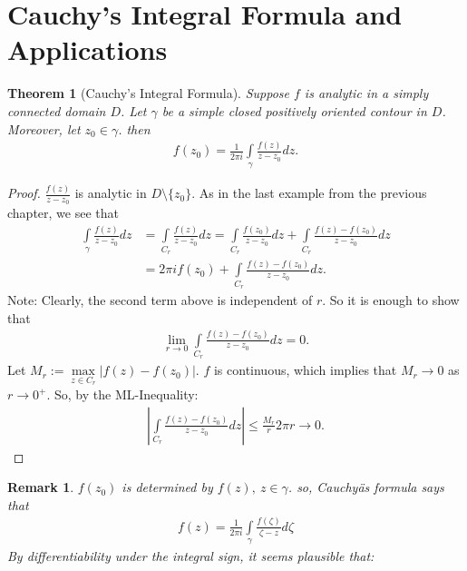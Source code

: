 \documentclass[12pt, a4paper]{article}
\theoremstyle{plain}
\newtheorem{thm}{Theorem} %
\newtheorem{rem}{Remark}
\theoremstyle{definition}
\begin{document}
	\section{Cauchy's Integral Formula and Applications} %
	\label{sec:cauchy_s_integral_formula_and_applications}
		\begin{thm}[Cauchy's Integral Formula]
			Suppose $f$ is analytic in a simply connected domain $D$. Let $\gamma$ be a simple closed positively oriented contour in $D$. Moreover, let $z_0\in \gamma$. then
			\begin{align*}
				f(z_0) = \frac{1}{2\pi i}\int\limits_{\gamma}\frac{f(z)}{z-z_0}dz.
			\end{align*}
		\end{thm}

		\begin{proof}
			$\displaystyle \frac{f(z)}{z-z_0}$ is analytic in $D\setminus\{z_0\}$. As in the last example from the previous chapter, we see that
			\begin{align*}
				\int\limits_{\gamma}\frac{f(z)}{z-z_0}dz &= 
				\int\limits_{C_r}\frac{f(z)}{z-z_0}dz =
				\int\limits_{C_r}\frac{f(z_0)}{z-z_0}dz +
				\int\limits_{C_r}\frac{f(z)-f(z_0)}{z-z_0}dz \\ &=
				2\pi i f(z_0) + \int\limits_{C_r}\frac{f(z)-f(z_0)}{z-z_0}dz.
			\end{align*}
			Note: Clearly, the second term above is independent of $r$. So it is enough to show that
			\begin{align*}
				\lim\limits_{r\to 0}\int\limits_{C_r}\frac{f(z)-f(z_0)}{z-z_0}dz = 0.
			\end{align*}
			Let $M_r:=\max\limits_{z\in C_r}|f(z)-f(z_0)|$. $f$ is continuous, which implies that $M_r\to 0$ as $r\to 0^+$. So, by the ML-Inequality:
			\begin{align*}
				\left|\int\limits_{C_r}\frac{f(z)-f(z_0)}{z-z_0}dz\right|\le
				\frac{M_r}{r}2\pi r \to 0.
			\end{align*}
		\end{proof}

		\begin{rem}
			$f(z_0)$ is determined by $f(z),\:z\in \gamma$. so, Cauchyäs formula says that
			\begin{align*}
				f(z) = \frac{1}{2\pi i}\int\limits_{\gamma}\frac{f(\zeta)}{\zeta-z}d \zeta\tag*{$z$ interior to $\gamma$.}
			\end{align*}
			By differentiability under the integral sign, it seems plausible that:\\
		\end{rem}
\end{document}
